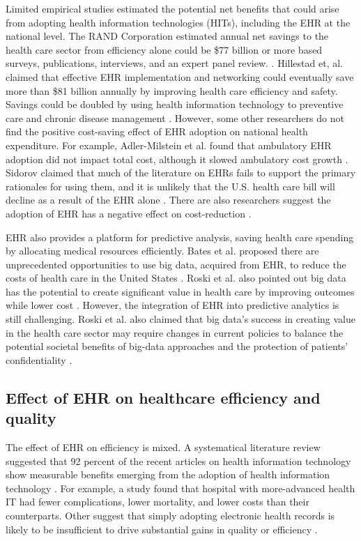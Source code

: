 Limited empirical studies estimated the potential net benefits that could arise from adopting health information technologies (HITs), including the EHR at the national level. The RAND Corporation estimated annual net savings to the health care sector from efficiency alone could be \$77 billion or more based surveys, publications, interviews, and an expert panel review. \citep{Rand2005}. Hillestad et, al. claimed that effective EHR implementation and networking could eventually save more than \$81 billion annually by improving health care efficiency and safety. Savings could be doubled by using health information technology to preventive care and chronic disease management \citep{Hillestad2005}. However, some other researchers do not find the positive cost-saving effect of EHR adoption on national health expenditure. For example, Adler-Milstein et al. found that ambulatory EHR adoption did not impact total cost, although it slowed ambulatory cost growth \citep{Adler-Milstein2013}. Sidorov claimed that much of the literature on EHRs fails to support the primary rationales for using them, and it is unlikely that the U.S. health care bill will decline as a result of the EHR alone \citep{Sidorov2006}. There are also researchers suggest the adoption of EHR has a negative effect on cost-reduction  \citep{Teufel2012}.

EHR also provides a platform for predictive analysis, saving health care spending by allocating medical resources efficiently. Bates et al. proposed there are unprecedented opportunities to use big data, acquired from EHR, to reduce the costs of health care in the United States \citep{Bates2014}. Roski et al. also pointed out big data has the potential to create significant value in health care by improving outcomes while lower cost \citep{Roski2014}. However, the integration of EHR into predictive analytics is still challenging. Roski et al. also claimed that big data's success in creating value in the health care sector may require changes in current policies to balance the potential societal benefits of big-data approaches and the protection of patients' confidentiality \citep{Roski2014}.

\subsection{Effect of EHR on healthcare efficiency and quality}

The effect of EHR on efficiency is mixed. A systematical literature review suggested that 92 percent of the recent articles on health information technology show measurable benefits emerging from the adoption of health information technology \citep{Buntin2011}. For example, a study found that hospital with more-advanced health IT had fewer complications, lower mortality, and lower costs than their counterparts\citep{amarasingham2009clinical}. Other suggest that simply adopting electronic health records is likely to be insufficient to drive substantial gains in quality or efficiency \citep{DesRoches2010}. 

